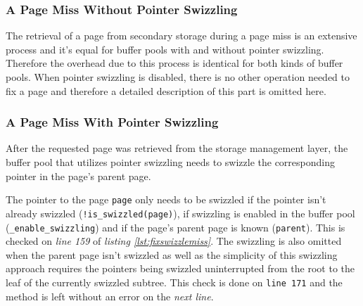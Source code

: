 \subsubsection{A Page Miss Without Pointer Swizzling} \label{subsubsec:pagemisswithout}

	The retrieval of a page from secondary storage during a page miss is an extensive process and it's equal for buffer pools with and without pointer swizzling. Therefore the overhead due to this process is identical for both kinds of buffer pools. When pointer swizzling is disabled, there is no other operation needed to fix a page and therefore a detailed description of this part is omitted here.

\subsubsection{A Page Miss With Pointer Swizzling} \label{subsubsec:pagemisswith}

	After the requested page was retrieved from the storage management layer, the buffer pool that utilizes pointer swizzling needs to swizzle the corresponding pointer in the page's parent page.

\begin{@empty}
	\lstset{
		language = [ISO]C++,
		style = basic
	}
	\begin{code}[ht!]
		\caption{Implementation of the swizzling of a pointer in \lstinline{bf_tree_m::fix()} in case of a page miss} \label{lst:fixswizzlemiss}
		
	\end{code}
\end{@empty}	
	
	The pointer to the page \lstinline{page} only needs to be swizzled if the pointer isn't already swizzled (\lstinline{!is_swizzled(page)}), if swizzling is enabled in the buffer pool (\lstinline{_enable_swizzling}) and if the page's parent page is known (\lstinline{parent}). This is checked on \emph{line 159} of \emph{listing \ref{lst:fixswizzlemiss}}. The swizzling is also omitted when the parent page isn't swizzled as well as the simplicity of this swizzling approach requires the pointers being swizzled uninterrupted from the root to the leaf of the currently swizzled subtree. This check is done on \lstinline{line 171} and the method is left without an error on the \emph{next line}.
	
